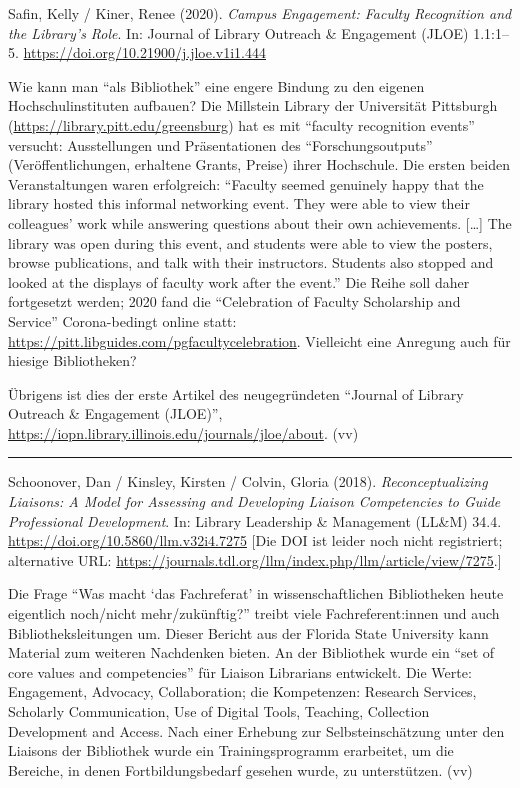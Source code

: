 \documentclass[a4paper,
fontsize=11pt,
oneside,
numbers=noperiodatend,
parskip=half-,
bibliography=totoc,
final
]{scrartcl}
\begin{document}
Safin, Kelly / Kiner, Renee (2020). \emph{Campus Engagement: Faculty
Recognition and the Library's Role}. In: Journal of Library Outreach \&
Engagement (JLOE) 1.1:1--5.
\url{https://doi.org/10.21900/j.jloe.v1i1.444}

Wie kann man \enquote{als Bibliothek} eine engere Bindung zu den eigenen
Hochschulinstituten aufbauen? Die Millstein Library der Universität
Pittsburgh (\url{https://library.pitt.edu/greensburg}) hat es mit
\enquote{faculty recognition events} versucht: Ausstellungen und
Präsentationen des \enquote{Forschungsoutputs} (Veröffentlichungen,
erhaltene Grants, Preise) ihrer Hochschule. Die ersten beiden
Veranstaltungen waren erfolgreich: \enquote{Faculty seemed genuinely
happy that the library hosted this informal networking event. They were
able to view their colleagues' work while answering questions about
their own achievements. {[}\ldots{]} The library was open during this
event, and students were able to view the posters, browse publications,
and talk with their instructors. Students also stopped and looked at the
displays of faculty work after the event.} Die Reihe soll daher
fortgesetzt werden; 2020 fand die \enquote{Celebration of Faculty
Scholarship and Service} Corona-bedingt online statt:
\url{https://pitt.libguides.com/pgfacultycelebration}. Vielleicht eine
Anregung auch für hiesige Bibliotheken?

Übrigens ist dies der erste Artikel des neugegründeten \enquote{Journal
of Library Outreach \& Engagement (JLOE)},
\url{https://iopn.library.illinois.edu/journals/jloe/about}. (vv)

\begin{center}\rule{0.5\linewidth}{0.5pt}\end{center}

\pagebreak

Schoonover, Dan / Kinsley, Kirsten / Colvin, Gloria (2018).
\emph{Reconceptualizing Liaisons: A Model for Assessing and Developing
Liaison Competencies to Guide Professional Development}. In: Library
Leadership \& Management (LL\&M) 34.4.
\url{https://doi.org/10.5860/llm.v32i4.7275} {[}Die DOI ist leider noch
nicht registriert; alternative URL:
\url{https://journals.tdl.org/llm/index.php/llm/article/view/7275}.{]}

Die Frage \enquote{Was macht \enquote*{das Fachreferat} in
wissenschaftlichen Bibliotheken heute eigentlich noch/nicht
mehr/zukünftig?} treibt viele Fachreferent:innen und auch
Bibliotheksleitungen um. Dieser Bericht aus der Florida State University
kann Material zum weiteren Nachdenken bieten. An der Bibliothek wurde
ein \enquote{set of core values and competencies} für Liaison Librarians
entwickelt. Die Werte: Engagement, Advocacy, Collaboration; die
Kompetenzen: Research Services, Scholarly Communication, Use of Digital
Tools, Teaching, Collection Development and Access. Nach einer Erhebung
zur Selbsteinschätzung unter den Liaisons der Bibliothek wurde ein
Trainingsprogramm erarbeitet, um die Bereiche, in denen
Fortbildungsbedarf gesehen wurde, zu unterstützen. (vv)
\end{document}
